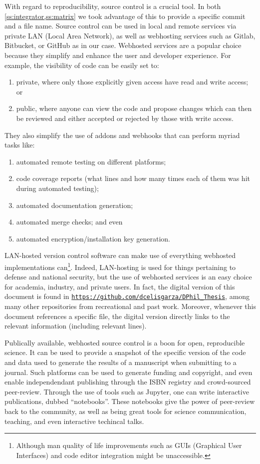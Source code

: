 With regard to reproducibility, source control is a crucial tool. In both \cref{ss:integrator,ss:matrix} we took advantage of this to provide a specific commit and a file name. Source control can be used in local and remote services via private LAN (Local Area Network), as well as webhosting services such as Gitlab, Bitbucket, or GitHub as in our case. Webhosted services are a popular choice because they simplify and enhance the user and developer experience. For example, the visibility of code can be easily set to:
\begin{enumerate}
    \item private, where only those explicitly given access have read and write access; or
    \item public, where anyone can view the code and propose changes which can then be reviewed and either accepted or rejected by those with write access.
\end{enumerate}
They also simplify the use of addons and webhooks that can perform myriad tasks like:
\begin{enumerate}
    \item automated remote testing on different platforms;
    \item code coverage reports (what lines and how many times each of them was hit during automated testing);
    \item automated documentation generation;
    \item automated merge checks; and even
    \item automated encryption/installation key generation.
\end{enumerate}

LAN-hosted version control software can make use of everything webhosted implementations can\footnote{Although man quality of life improvements such as GUIs (Graphical User Interfaces) and code editor integration might be unaccessible.}. Indeed, LAN-hosting is used for things pertaining to defense and national security, but the use of webhosted services is an easy choice for academia, industry, and private users. In fact, the digital version of this document is found in \href{https://github.com/dcelisgarza/DPhil_Thesis}{\texttt{https://github.com/dcelisgarza/DPhil\_Thesis}}, among many other repositories from recreational and past work. Moreover, whenever this document references a specific file, the digital version directly links to the relevant information (including relevant lines).

Publically available, webhosted source control is a boon for open, reproducible science. It can be used to provide a snapshot of the specific version of the code and data used to generate the results of a manuscript when submitting to a journal. Such platforms can be used to generate funding and copyright, and even enable independendant publishing through the ISBN registry and crowd-sourced peer-review. Through the use of tools such as Jupyter, one can write interactive publications, dubbed ``notebooks''. These notebooks give the power of peer-review back to the community, as well as being great tools for science communication, teaching, and even interactive techincal talks.


